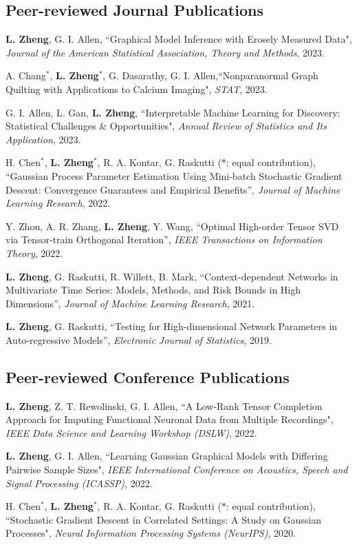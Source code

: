 \documentclass[letterpaper,11pt]{article}
\begin{document}
	\subsection*{Peer-reviewed Journal Publications}
	\begin{etaremune}[start=10]
		\item {\bf L. Zheng}, G. I. Allen, ``Graphical Model Inference with Erosely Measured Data", {\em Journal of the American Statistical Association, Theory and Methods}, 2023.
		\item  A. Chang$^{*}$, {\bf L. Zheng}$^{*}$, G. Dasarathy, G. I. Allen,``Nonparanormal Graph Quilting with Applications to Calcium Imaging", {\em STAT}, 2023.
		\item G. I. Allen, L. Gan, {\bf L. Zheng}, ``Interpretable Machine Learning for Discovery: Statistical Challenges \& Opportunities", {\em Annual Review of Statistics and Its Application}, 2023.
		\item H. Chen$^{*}$, {\bf L. Zheng}$^{*}$, R. A. Kontar, G. Raskutti ($*$: equal contribution), ``Gaussian Process Parameter Estimation Using Mini-batch Stochastic Gradient Descent: Convergence Guarantees and Empirical Benefits'', {\em Journal of Machine Learning Research}, 2022.
		\item Y. Zhou, A. R. Zhang, {\bf L. Zheng}, Y. Wang, ``Optimal High-order Tensor SVD via Tensor-train Orthogonal
		Iteration'', {\em  IEEE Transactions on Information Theory}, 2022.
		\item {\bf L. Zheng}, G. Raskutti, R. Willett, B. Mark, ``Context-dependent Networks in Multivariate Time Series: Models, Methods, and Risk Bounds in High Dimensions'', {\em Journal of Machine Learning Research}, 2021.
		\item {\bf L. Zheng}, G. Raskutti, ``Testing for High-dimensional Network Parameters in Auto-regressive Models'', {\em Electronic Journal of Statistics}, 2019.
	\end{etaremune}
	\subsection*{Peer-reviewed Conference Publications}
\begin{etaremune}[start=3]
	\item {\bf L. Zheng}, Z. T. Rewolinski, G. I. Allen, ``A Low-Rank Tensor Completion Approach for Imputing Functional Neuronal Data from Multiple Recordings", {\em IEEE Data Science and Learning Workshop (DSLW)}, 2022.
	\item {\bf L. Zheng}, G. I. Allen, ``Learning Gaussian Graphical Models with Differing Pairwise Sample Sizes", {\em IEEE International Conference on Acoustics, Speech and Signal Processing (ICASSP)}, 2022.
	\item  H. Chen$^{*}$, {\bf L. Zheng}$^{*}$, R. A. Kontar, G. Raskutti ($*$: equal contribution), ``Stochastic Gradient Descent in Correlated Settings: A Study on Gaussian Processes", {\em Neural Information Processing Systems (NeurIPS)}, 2020.
\end{etaremune}
\end{document}
